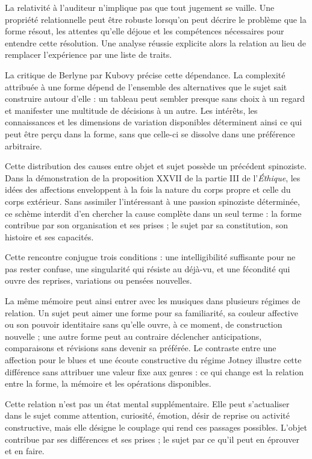 \documentclass[10pt,a4paper]{article}
\begin{document}
La relativité à l'auditeur n'implique pas que tout jugement se vaille. Une propriété relationnelle peut être robuste lorsqu'on peut décrire le problème que la forme résout, les attentes qu'elle déjoue et les compétences nécessaires pour entendre cette résolution. Une analyse réussie explicite alors la relation au lieu de remplacer l'expérience par une liste de traits.

La critique de Berlyne par Kubovy précise cette dépendance. La complexité attribuée à une forme dépend de l'ensemble des alternatives que le sujet sait construire autour d'elle : un tableau peut sembler presque sans choix à un regard et manifester une multitude de décisions à un autre. Les intérêts, les connaissances et les dimensions de variation disponibles déterminent ainsi ce qui peut être perçu dans la forme, sans que celle-ci se dissolve dans une préférence arbitraire.

Cette distribution des causes entre objet et sujet possède un précédent spinoziste. Dans la démonstration de la proposition XXVII de la partie III de l'\emph{Éthique}, les idées des affections enveloppent à la fois la nature du corps propre et celle du corps extérieur. Sans assimiler l'intéressant à une passion spinoziste déterminée, ce schème interdit d'en chercher la cause complète dans un seul terme : la forme contribue par son organisation et ses prises ; le sujet par sa constitution, son histoire et ses capacités.

Cette rencontre conjugue trois conditions : une intelligibilité suffisante pour ne pas rester confuse, une singularité qui résiste au déjà-vu, et une fécondité qui ouvre des reprises, variations ou pensées nouvelles.

La même mémoire peut ainsi entrer avec les musiques dans plusieurs régimes de relation. Un sujet peut aimer une forme pour sa familiarité, sa couleur affective ou son pouvoir identitaire sans qu'elle ouvre, à ce moment, de construction nouvelle ; une autre forme peut au contraire déclencher anticipations, comparaisons et révisions sans devenir sa préférée. Le contraste entre une affection pour le blues et une écoute constructive du régime Jotney illustre cette différence sans attribuer une valeur fixe aux genres : ce qui change est la relation entre la forme, la mémoire et les opérations disponibles.

Cette relation n'est pas un état mental supplémentaire. Elle peut s'actualiser dans le sujet comme attention, curiosité, émotion, désir de reprise ou activité constructive, mais elle désigne le couplage qui rend ces passages possibles. L'objet contribue par ses différences et ses prises ; le sujet par ce qu'il peut en éprouver et en faire.
\end{document}
